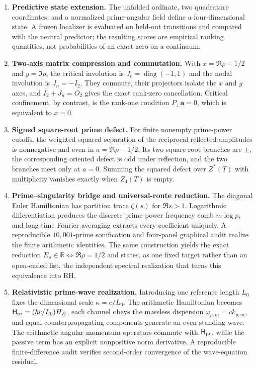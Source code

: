 \documentclass[11pt]{amsart}
\theoremstyle{definition}
\theoremstyle{remark}
\begin{document}
\begin{enumerate}[label=\textbf{R\arabic*.},leftmargin=*]
\item \textbf{Predictive state extension.} The unfolded ordinate, two quadrature coordinates, and a normalized prime-angular field define a four-dimensional state.  A frozen localizer is evaluated on held-out transitions and compared with the neutral predictor; the resulting scores are empirical ranking quantities, not probabilities of an exact zero on a continuum.
\item \textbf{Two-axis matrix compression and commutation.}  With
$x=\Re\rho-1/2$ and $y=\Im\rho$, the critical involution is
$J_c=\operatorname{diag}(-1,1)$ and the nodal involution is $J_n=-I_2$.
They commute, their projectors isolate the $x$ and $y$ axes, and
$I_2+J_n=O_2$ gives the exact rank-zero cancellation.  Critical confinement,
by contrast, is the rank-one condition $P_{\perp}\mathbf a=0$, which is
equivalent to $x=0$.
\item \textbf{Signed square-root prime defect.}  For finite nonempty prime-power
cutoffs, the weighted squared separation of the reciprocal reflected amplitudes is
nonnegative and even in $a=\Re\rho-1/2$.  Its two square-root branches are $\pm$,
the corresponding oriented defect is odd under reflection, and the two branches meet
only at $a=0$.  Summing the squared defect over $Z^*(T)$ with multiplicity vanishes
exactly when $Z_4(T)$ is empty.
\item \textbf{Prime--singularity bridge and universal-route reduction.}  The diagonal
Euler Hamiltonian has partition trace $\zeta(s)$ for $\Re s>1$.  Logarithmic
differentiation produces the discrete prime-power frequency comb $m\log p$, and
long-time Fourier averaging extracts every coefficient uniquely.  A reproducible
$10{,}001$-prime sonification and four-panel graphical audit realize the finite
arithmetic identities.  The same construction yields the exact reduction
$E_\rho\in\mathbb R\iff\Re\rho=1/2$ and states, as one fixed target rather than an
open-ended list, the independent spectral realization that turns this equivalence into RH.
\item \textbf{Relativistic prime-wave realization.}  Introducing one reference length
$L_0$ fixes the dimensional scale $\kappa=c/L_0$.  The arithmetic Hamiltonian becomes
$\mathsf H_{\rm pr}=(\hbar c/L_0)H_E$, each channel obeys the massless dispersion
$\omega_{p,m}=ck_{p,m}$, and equal counterpropagating components generate an even standing
wave.  The arithmetic angular-momentum operators commute with $\mathsf H_{\rm pr}$, while
the passive term has an explicit nonpositive norm derivative.  A reproducible finite-difference
audit verifies second-order convergence of the wave-equation residual.
\end{enumerate}
\end{document}
